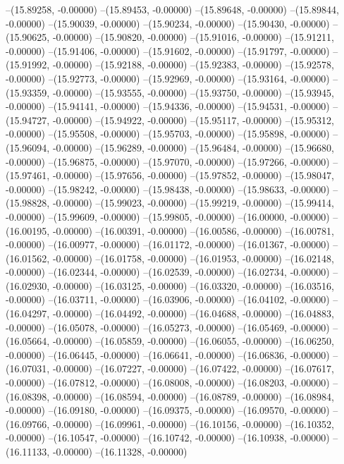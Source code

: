 --(15.89258, -0.00000)
--(15.89453, -0.00000)
--(15.89648, -0.00000)
--(15.89844, -0.00000)
--(15.90039, -0.00000)
--(15.90234, -0.00000)
--(15.90430, -0.00000)
--(15.90625, -0.00000)
--(15.90820, -0.00000)
--(15.91016, -0.00000)
--(15.91211, -0.00000)
--(15.91406, -0.00000)
--(15.91602, -0.00000)
--(15.91797, -0.00000)
--(15.91992, -0.00000)
--(15.92188, -0.00000)
--(15.92383, -0.00000)
--(15.92578, -0.00000)
--(15.92773, -0.00000)
--(15.92969, -0.00000)
--(15.93164, -0.00000)
--(15.93359, -0.00000)
--(15.93555, -0.00000)
--(15.93750, -0.00000)
--(15.93945, -0.00000)
--(15.94141, -0.00000)
--(15.94336, -0.00000)
--(15.94531, -0.00000)
--(15.94727, -0.00000)
--(15.94922, -0.00000)
--(15.95117, -0.00000)
--(15.95312, -0.00000)
--(15.95508, -0.00000)
--(15.95703, -0.00000)
--(15.95898, -0.00000)
--(15.96094, -0.00000)
--(15.96289, -0.00000)
--(15.96484, -0.00000)
--(15.96680, -0.00000)
--(15.96875, -0.00000)
--(15.97070, -0.00000)
--(15.97266, -0.00000)
--(15.97461, -0.00000)
--(15.97656, -0.00000)
--(15.97852, -0.00000)
--(15.98047, -0.00000)
--(15.98242, -0.00000)
--(15.98438, -0.00000)
--(15.98633, -0.00000)
--(15.98828, -0.00000)
--(15.99023, -0.00000)
--(15.99219, -0.00000)
--(15.99414, -0.00000)
--(15.99609, -0.00000)
--(15.99805, -0.00000)
--(16.00000, -0.00000)
--(16.00195, -0.00000)
--(16.00391, -0.00000)
--(16.00586, -0.00000)
--(16.00781, -0.00000)
--(16.00977, -0.00000)
--(16.01172, -0.00000)
--(16.01367, -0.00000)
--(16.01562, -0.00000)
--(16.01758, -0.00000)
--(16.01953, -0.00000)
--(16.02148, -0.00000)
--(16.02344, -0.00000)
--(16.02539, -0.00000)
--(16.02734, -0.00000)
--(16.02930, -0.00000)
--(16.03125, -0.00000)
--(16.03320, -0.00000)
--(16.03516, -0.00000)
--(16.03711, -0.00000)
--(16.03906, -0.00000)
--(16.04102, -0.00000)
--(16.04297, -0.00000)
--(16.04492, -0.00000)
--(16.04688, -0.00000)
--(16.04883, -0.00000)
--(16.05078, -0.00000)
--(16.05273, -0.00000)
--(16.05469, -0.00000)
--(16.05664, -0.00000)
--(16.05859, -0.00000)
--(16.06055, -0.00000)
--(16.06250, -0.00000)
--(16.06445, -0.00000)
--(16.06641, -0.00000)
--(16.06836, -0.00000)
--(16.07031, -0.00000)
--(16.07227, -0.00000)
--(16.07422, -0.00000)
--(16.07617, -0.00000)
--(16.07812, -0.00000)
--(16.08008, -0.00000)
--(16.08203, -0.00000)
--(16.08398, -0.00000)
--(16.08594, -0.00000)
--(16.08789, -0.00000)
--(16.08984, -0.00000)
--(16.09180, -0.00000)
--(16.09375, -0.00000)
--(16.09570, -0.00000)
--(16.09766, -0.00000)
--(16.09961, -0.00000)
--(16.10156, -0.00000)
--(16.10352, -0.00000)
--(16.10547, -0.00000)
--(16.10742, -0.00000)
--(16.10938, -0.00000)
--(16.11133, -0.00000)
--(16.11328, -0.00000)
